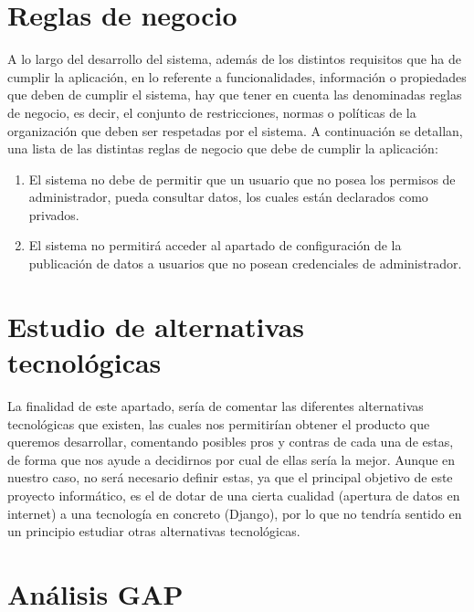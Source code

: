 \section{Reglas de negocio}

A lo largo del desarrollo del sistema, además de los distintos requisitos que ha
de cumplir la aplicación, en lo referente a funcionalidades, información o
propiedades que deben de cumplir el sistema, hay que tener en cuenta las
denominadas reglas de negocio, es decir, el conjunto de restricciones, normas o
políticas de la organización que deben ser respetadas por el sistema. A
continuación se detallan, una lista de las distintas reglas de negocio que debe
de cumplir la aplicación:
\begin{enumerate}
    \item El sistema no debe de permitir que un usuario que no posea los
           permisos de administrador, pueda consultar datos, los cuales están
           declarados como privados.
    \item El sistema no permitirá acceder al apartado de configuración de la
           publicación de datos a usuarios que no posean credenciales de
           administrador.
\end{enumerate}

\section{Estudio de alternativas tecnológicas}

La finalidad de este apartado, sería de comentar las diferentes alternativas
tecnológicas que existen, las cuales nos permitirían obtener el producto que
queremos desarrollar, comentando posibles pros y contras de cada una de estas,
de forma que nos ayude a decidirnos por cual de ellas sería la mejor. Aunque en
nuestro caso, no será necesario definir estas, ya que el principal objetivo de
este proyecto informático, es el de dotar de una cierta cualidad (apertura de
datos en internet) a una tecnología en concreto (Django), por lo que no tendría
sentido en un principio estudiar otras alternativas tecnológicas.

\section{Análisis GAP}

